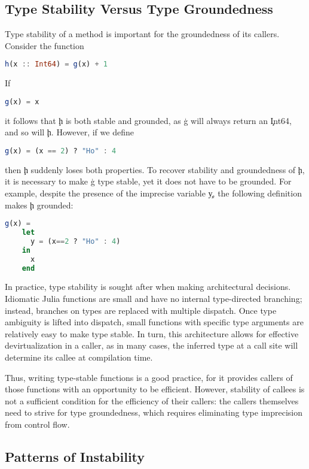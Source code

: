 \subsection{Type Stability Versus Type Groundedness}

Type stability of a method is important for the groundedness of its callers.
Consider the function %
\begin{lstlisting}[language=julia]
  h(x :: Int64) = g(x) + 1
\end{lstlisting}
If %
\begin{lstlisting}[language=julia]
  g(x) = x
\end{lstlisting}
it follows that
\c{h} is both stable and grounded, as \c{g} will always return an \c{Int64}, and
so will \c{h}. However, if we define %
\begin{lstlisting}[language=julia]
  g(x) = (x == 2) ? "Ho" : 4
\end{lstlisting}
then \c{h}
suddenly loses both properties. To recover stability and groundedness of \c{h},
it is necessary to make \c{g} type stable, yet it does not have to be grounded.
For example, despite the presence of the imprecise variable \c{y}, the following
definition makes \c{h} grounded: %
\begin{lstlisting}[language=julia]
  g(x) = 
    let
      y = (x==2 ? "Ho" : 4)
    in
      x 
    end
\end{lstlisting}

In practice, type stability is sought after when making architectural decisions.
Idiomatic Julia functions are small and have no internal type-directed
branching; instead, branches on types are replaced with multiple dispatch.
Once type ambiguity is lifted into dispatch, small functions with specific
type arguments are relatively easy to make type stable. In turn, this
architecture allows for effective devirtualization in a caller, as in many cases, the
inferred type at a call site will determine its callee at compilation time.

Thus, writing type-stable functions is a good practice, for it provides
callers of those functions with an opportunity to be efficient.
However, stability of callees is not a sufficient condition for the efficiency
of their callers: the callers themselves need to strive for type groundedness,
which requires eliminating type imprecision from control flow.

\subsection{Patterns of Instability}

